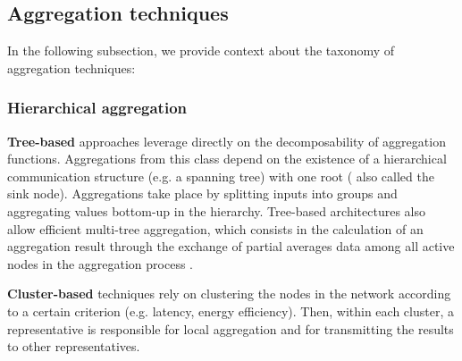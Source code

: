 

\subsection{Aggregation techniques}

In the following subsection, we provide context about the taxonomy of aggregation techniques:

\subsubsection*{Hierarchical aggregation}

\textbf{Tree-based} approaches leverage directly on the decomposability of aggregation functions. Aggregations from this class depend on the existence of a hierarchical communication structure (e.g. a spanning tree) with one root ( also called the sink node). Aggregations take place by splitting inputs into groups and aggregating values bottom-up in the hierarchy.  Tree-based architectures also allow efficient multi-tree aggregation, which consists in the calculation of an aggregation result through the exchange of partial averages data among all active nodes in the aggregation process \cite{8613952}. 


\textbf{Cluster-based} techniques rely on clustering the nodes in the network according to a certain criterion (e.g. latency, energy efficiency). Then, within each cluster, a representative is responsible for local aggregation and for transmitting the results to other representatives. 

